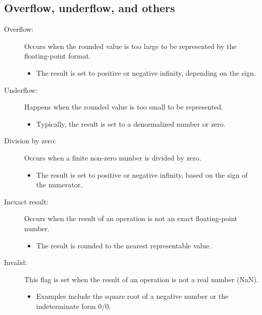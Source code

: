 \documentclass[12pt,openany]{book}
\begin{document}
			      	\subsection{Overflow, underflow, and others}
			      	\begin{description}
			      		\item[Overflow:] Occurs when the rounded value is too large to be represented by the floating-point format.
			      		\begin{itemize}
			      			\item The result is set to positive or negative infinity, depending on the sign.
			      		\end{itemize}
			      		    
			      		\item[Underflow:] Happens when the rounded value is too small to be represented.
			      		\begin{itemize}
			      			\item Typically, the result is set to a denormalized number or zero.
			      		\end{itemize}
			      		    
			      		\item[Division by zero:] Occurs when a finite non-zero number is divided by zero.
			      		\begin{itemize}
			      			\item The result is set to positive or negative infinity, based on the sign of the numerator.
			      		\end{itemize}
			      		    
			      		\item[Inexact result:] Occurs when the result of an operation is not an exact floating-point number.
			      		\begin{itemize}
			      			\item The result is rounded to the nearest representable value.
			      		\end{itemize}
			      		    
			      		\item[Invalid:] This flag is set when the result of an operation is not a real number (NaN).
			      		\begin{itemize}
			      			\item Examples include the square root of a negative number or the indeterminate form 0/0.
			      		\end{itemize}
			      	\end{description}
			      	
\end{document}
